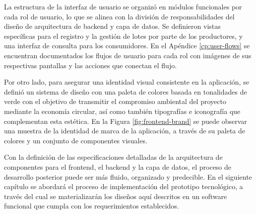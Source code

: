 La estructura de la interfaz de usuario se organizó en módulos funcionales por cada rol de usuario, lo que se alinea con la división de responsabilidades del diseño de arquitectura de backend y capa de datos. Se definieron vistas específicas para el registro y la gestión de lotes por parte de los productores, y una interfaz de consulta para los consumidores. En el Apéndice \ref{cp:user-flows} se encuentran documentados los flujos de usuario para cada rol con imágenes de sus respectivas pantallas y las acciones que conectan el flujo.

Por otro lado, para asegurar una identidad visual consistente en la aplicación, se definió un sistema de diseño con una paleta de colores basada en tonalidades de verde con el objetivo de transmitir el compromiso ambiental del proyecto mediante la economía circular, así como también tipografías e iconografía que complementan esta estética. En la Figura \ref{fig:frontend-brand} se puede observar una muestra de la identidad de marca de la aplicación, a través de su paleta de colores y un conjunto de componentes visuales.

Con la definición de las especificaciones detalladas de la arquitectura de componentes para el frontend, el backend y la capa de datos, el proceso de desarrollo posterior puede ser más fluido, organizado y predecible. En el siguiente capítulo se abordará el proceso de implementación del prototipo tecnológico, a través del cual se materializarán los diseños aquí descritos en un software funcional que cumpla con los requerimientos establecidos.
